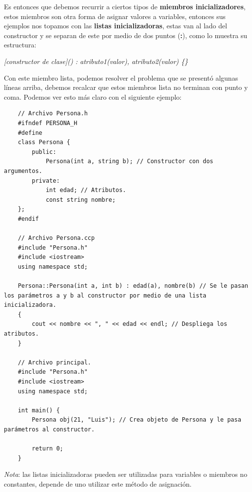 Es entonces que debemos recurrir a ciertos tipos de \textbf{miembros inicializadores}, estos miembros son otra forma de asignar valores a variables, entonces sus ejemplos nos topamos con las \textbf{listas inicializadoras}, estas van al lado del constructor y se separan de este por medio de dos puntos (\textbf{:}), como lo muestra su estructura:
\begin{center}
	\textit{[constructor de clase]() : atributo1(valor), atributo2(valor) \{\}}
\end{center}

Con este miembro lista, podemos resolver el problema que se presentó algunas líneas arriba, debemos recalcar que estos miembros lista no terminan con punto y coma. Podemos ver esto más claro con el siguiente ejemplo:
\begin{lstlisting}
    // Archivo Persona.h
    #ifndef PERSONA_H
    #define
    class Persona {
        public:
            Persona(int a, string b); // Constructor con dos argumentos.
        private:
            int edad; // Atributos.
            const string nombre;
    };
    #endif
    
    // Archivo Persona.ccp
    #include "Persona.h"
    #include <iostream>
    using namespace std;
    
    Persona::Persona(int a, int b) : edad(a), nombre(b) // Se le pasan los parámetros a y b al constructor por medio de una lista inicializadora.
    {
        cout << nombre << ", " << edad << endl; // Despliega los atributos.
    }
    
    // Archivo principal.
    #include "Persona.h"
    #include <iostream>
    using namespace std;
    
    int main() {
        Persona obj(21, "Luis"); // Crea objeto de Persona y le pasa parámetros al constructor.
    
        return 0;
    }
\end{lstlisting}

\textit{Nota}: las listas inicializadoras pueden ser utilizadas para variables o miembros no constantes, depende de uno utilizar este método de asignación.


